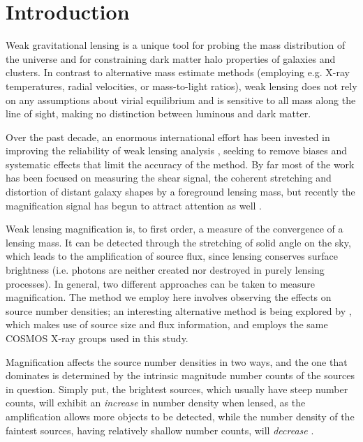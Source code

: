 \documentclass[iop]{emulateapj}
\begin{document}
 
\setcounter{section}{0}
\setcounter{subsection}{0}
\setcounter{subsubsection}{0}

\section{Introduction}
Weak gravitational lensing is a unique tool for probing the mass distribution of the universe and for constraining dark matter halo properties of galaxies and clusters. In contrast to alternative mass estimate methods (employing e.g. X-ray temperatures, radial velocities, or mass-to-light ratios), weak lensing does not rely on any assumptions about virial equilibrium and is sensitive to all mass along the line of sight, making no distinction between luminous and dark matter.

Over the past decade, an enormous international effort has been invested in improving the reliability of weak lensing analysis \citep{step1, step2, great08, great10}, seeking to remove biases and systematic effects that limit the accuracy of the method. By far most of the work has been focused on measuring the shear signal, the coherent stretching and distortion of distant galaxy shapes by a foreground lensing mass, but recently the magnification signal has begun to attract attention as well \citep{Scranton05, Hildebrandt09b, Hildebrandt11, LHJM10, Umetsu11, Huff11}.  

Weak lensing magnification is, to first order, a measure of the convergence of a lensing mass. It can be detected through the stretching of solid angle on the sky, which leads to the amplification of source flux, since lensing conserves surface brightness (i.e. photons are neither created nor destroyed in purely lensing processes). In general, two different approaches can be taken to measure magnification. The method we employ here involves observing the effects on source number densities; an interesting alternative method is being explored by \citet{Schmidt12}, which makes use of source size and flux information, and employs the same COSMOS X-ray groups used in this study.

Magnification affects the source number densities in two ways, and the one that dominates is determined by the intrinsic magnitude number counts of the sources in question. Simply put, the brightest sources, which usually have steep number counts, will exhibit an {\it increase} in number density when lensed, as the amplification allows more objects to be detected, while the number density of the faintest sources, having relatively shallow number counts, will {\it decrease} \citep{Narayan89}.
\end{document}
